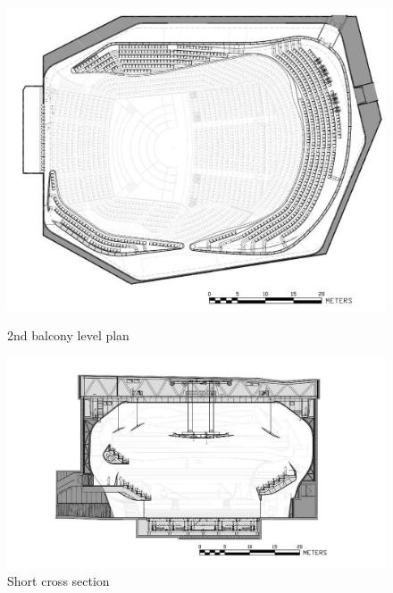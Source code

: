 \begin{figure}[htbp]
 \begin{minipage}{0.5\hsize}
  \begin{center}
   \includegraphics[scale=0.15]{01_att/PLAN_2nd_Balcony_Level.png}
  \end{center}
  \caption{\hspace{1mm}2nd balcony level plan}
 \end{minipage}
 \begin{minipage}{0.5\hsize}
  \begin{center}
   \includegraphics[scale=0.15]{01_att/SECTION_Short.png}
  \end{center}
  \caption{\hspace{1mm}Short cross section}
 \end{minipage}
\end{figure}
